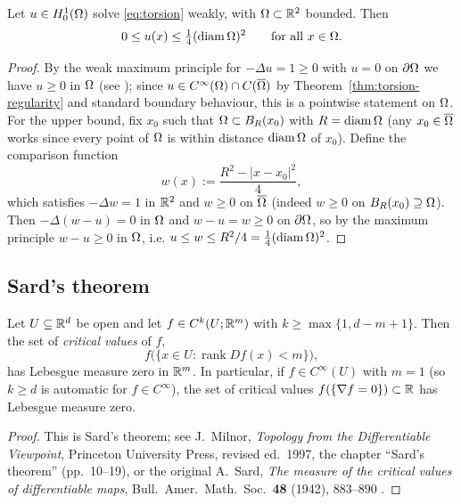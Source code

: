 \begin{lemma}\label{lem:linfty}
Let $u\in H^1_0(\Omega)$ solve \eqref{eq:torsion} weakly, with $\Omega\subset\mathbb{R}^2$
bounded. Then
\[
  0\le u(x)\le \tfrac14(\operatorname{diam}\Omega)^2\qquad\text{for all }x\in\Omega .
\]
\end{lemma}

\begin{proof}
By the weak maximum principle for $-\Delta u=1\ge0$ with $u=0$ on
$\partial\Omega$ we have $u\ge0$ in $\Omega$ (see
\cite[Theorem~8.1]{GT1983}); since $u\in C^\infty(\Omega)\cap
C(\overline{\Omega})$ by Theorem~\ref{thm:torsion-regularity} and standard boundary
behaviour, this is a pointwise statement on $\Omega$. For the upper bound, fix
$x_0$ such that $\Omega\subset B_R(x_0)$ with $R=\operatorname{diam}\Omega$ (any
$x_0\in\overline{\Omega}$ works since every point of $\Omega$ is within distance
$\operatorname{diam}\Omega$ of $x_0$). Define the comparison function
\[
  w(x):=\frac{R^2-|x-x_0|^2}{4},
\]
which satisfies $-\Delta w=1$ in $\mathbb{R}^2$ and $w\ge0$ on $\overline{\Omega}$ (indeed
$w\ge0$ on $B_R(x_0)\supseteq\Omega$). Then $-\Delta(w-u)=0$ in $\Omega$ and
$w-u=w\ge0$ on $\partial\Omega$, so by the maximum principle
\cite[Corollary~3.2]{GT1983} $w-u\ge0$ in $\Omega$, i.e.
$u\le w\le R^2/4=\tfrac14(\operatorname{diam}\Omega)^2$.
\end{proof}

\subsection{Sard's theorem}\label{ss:sard}

\begin{theorem}[Sard]\label{thm:sard}
Let $U\subseteq\mathbb{R}^d$ be open and let $f\in C^k(U;\mathbb{R}^m)$ with
$k\ge\max\{1,d-m+1\}$. Then the set of \emph{critical values} of $f$,
\[
  f\big(\{x\in U:\operatorname{rank} Df(x)<m\}\big),
\]
has Lebesgue measure zero in $\mathbb{R}^m$. In particular, if $f\in C^\infty(U)$
with $m=1$ (so $k\ge d$ is automatic for $f\in C^\infty$), the set of
critical values $f(\{\nabla f=0\})\subset\mathbb{R}$ has Lebesgue measure zero.
\end{theorem}

\begin{proof}
This is Sard's theorem; see J.~Milnor, \emph{Topology from the Differentiable
Viewpoint}, Princeton University Press, revised ed.\ 1997, the chapter
``Sard's theorem'' (pp.~10--19), or the original A.~Sard, \emph{The measure of
the critical values of differentiable maps}, Bull.\ Amer.\ Math.\ Soc.\
\textbf{48} (1942), 883--890 \cite{Milnor1997,Sard1942}.
\end{proof}

